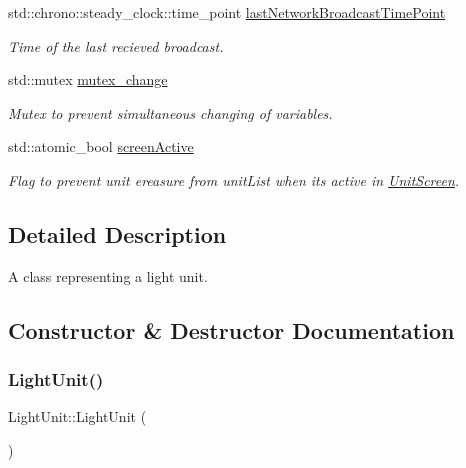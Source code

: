 \begin{DoxyCompactItemize}
\mbox{\label{classLightUnit_ac5f86e26fe02c192736cddd1d06af583}} 
std\+::chrono\+::steady\+\_\+clock\+::time\+\_\+point \mbox{\hyperlink{classLightUnit_ac5f86e26fe02c192736cddd1d06af583}{last\+Network\+Broadcast\+Time\+Point}}
\begin{DoxyCompactList}\small\item\em Time of the last recieved broadcast. \end{DoxyCompactList}\item 
\mbox{\label{classLightUnit_a4380f5dead3b35443b09f1dbbe44af55}} 
std\+::mutex \mbox{\hyperlink{classLightUnit_a4380f5dead3b35443b09f1dbbe44af55}{mutex\+\_\+change}}
\begin{DoxyCompactList}\small\item\em Mutex to prevent simultaneous changing of variables. \end{DoxyCompactList}\item 
\mbox{\label{classLightUnit_ad1053b699435285eee81f2ba49c12617}} 
std\+::atomic\+\_\+bool \mbox{\hyperlink{classLightUnit_ad1053b699435285eee81f2ba49c12617}{screen\+Active}}
\begin{DoxyCompactList}\small\item\em Flag to prevent unit ereasure from unit\+List when it\textquotesingle{}s active in \mbox{\hyperlink{classUnitScreen}{Unit\+Screen}}. \end{DoxyCompactList}\end{DoxyCompactItemize}


\subsection{Detailed Description}
A class representing a light unit. 

\subsection{Constructor \& Destructor Documentation}
\mbox{\label{classLightUnit_a28169090402e0a891c35a881760e14bd}} 
\subsubsection{\texorpdfstring{Light\+Unit()}{LightUnit()}\hspace{0.1cm}{\footnotesize\ttfamily [1/4]}}
{\footnotesize\ttfamily Light\+Unit\+::\+Light\+Unit (\begin{DoxyParamCaption}{ }\end{DoxyParamCaption})}

